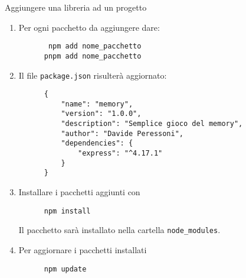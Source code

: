 \begin{frame}[fragile]{Aggiungere una libreria ad un progetto}\transfade\centering
  \begin{enumerate}[<+->]
    \item Per ogni pacchetto da aggiungere dare:
    \begin{verbatim}
       npm add nome_pacchetto
      pnpm add nome_pacchetto
    \end{verbatim}
    \item[] Il file \texttt{package.json} risulterà aggiornato:
    \begin{verbatim}
      {
          "name": "memory",
          "version": "1.0.0",
          "description": "Semplice gioco del memory",
          "author": "Davide Peressoni",
          "dependencies": {
              "express": "^4.17.1"
          }
      }
    \end{verbatim}
    \item Installare i pacchetti aggiunti con
    \begin{verbatim}
      npm install
    \end{verbatim}
    Il pacchetto sarà installato nella cartella \texttt{node\_modules}.
    \makeatletter
    \let\temp@theenumi\theenumi
    \def\theenumi{}
    \makeatother
    \item Per aggiornare i pacchetti installati
    \makeatletter
    \let\theenumi\temp@theenumi
    \makeatother
    \begin{verbatim}
      npm update
    \end{verbatim}
  \end{enumerate}
\end{frame}
